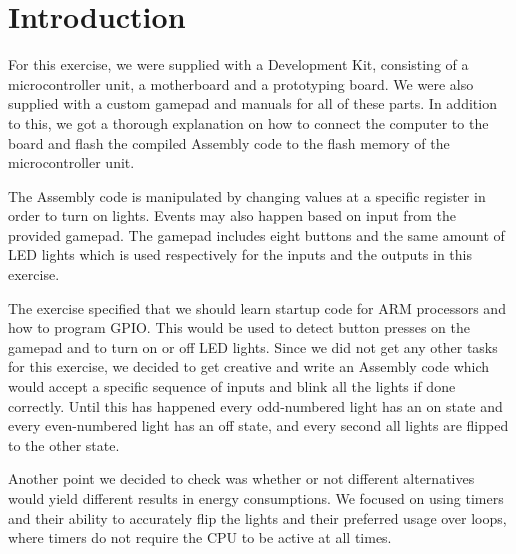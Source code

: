 \chapter{Introduction}

For this exercise, we were supplied with a Development Kit, consisting of a microcontroller unit, a motherboard and a prototyping board. We were also supplied with a custom gamepad and manuals for all of these parts. In addition to this, we got a thorough explanation on how to connect the computer to the board and flash the compiled Assembly code to the flash memory of the microcontroller unit.

The Assembly code is manipulated by changing values at a specific
register in order to turn on lights. Events may also happen based on input from the provided gamepad. The
gamepad includes eight buttons and the same amount of LED lights which is used respectively
for the inputs and the outputs in this exercise.

The exercise specified that we should learn startup code for ARM processors
and how to program GPIO. This would be used to detect button presses on the
gamepad and to turn on or off LED lights. Since we did not get any other tasks
for this exercise, we decided to get creative and write an Assembly code which
would accept a specific sequence of inputs and blink all the lights if done
correctly. Until this has happened every odd-numbered light has an on state and
every even-numbered light has an off state, and every second all lights are
flipped to the other state.

Another point we decided to check was whether or not different alternatives would yield different results in energy consumptions. We focused on using timers and their ability to accurately flip the lights and their preferred usage over loops, where timers do not require the CPU to be active at all times.